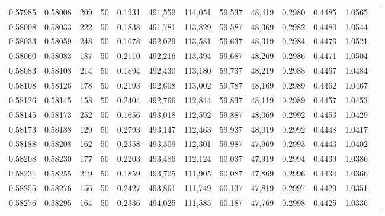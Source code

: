 \begin{tabular}{rrrrrrrrrrrrr}
0.57985 & 0.58008 &   209 &  50 &                                     0.1931 & 491,559 & 114,051 &  59,537 &  48,419 & 0.2980 & 0.4485 & 1.0565 \\
0.58008 & 0.58033 &   222 &  50 &                                     0.1838 & 491,781 & 113,829 &  59,587 &  48,369 & 0.2982 & 0.4480 & 1.0544 \\
0.58033 & 0.58059 &   248 &  50 &                                     0.1678 & 492,029 & 113,581 &  59,637 &  48,319 & 0.2984 & 0.4476 & 1.0521 \\
0.58060 & 0.58083 &   187 &  50 &                                     0.2110 & 492,216 & 113,394 &  59,687 &  48,269 & 0.2986 & 0.4471 & 1.0504 \\
0.58083 & 0.58108 &   214 &  50 &                                     0.1894 & 492,430 & 113,180 &  59,737 &  48,219 & 0.2988 & 0.4467 & 1.0484 \\
0.58108 & 0.58126 &   178 &  50 &                                     0.2193 & 492,608 & 113,002 &  59,787 &  48,169 & 0.2989 & 0.4462 & 1.0467 \\
0.58126 & 0.58145 &   158 &  50 &                                     0.2404 & 492,766 & 112,844 &  59,837 &  48,119 & 0.2989 & 0.4457 & 1.0453 \\
0.58145 & 0.58173 &   252 &  50 &                                     0.1656 & 493,018 & 112,592 &  59,887 &  48,069 & 0.2992 & 0.4453 & 1.0429 \\
0.58173 & 0.58188 &   129 &  50 &                                     0.2793 & 493,147 & 112,463 &  59,937 &  48,019 & 0.2992 & 0.4448 & 1.0417 \\
0.58188 & 0.58208 &   162 &  50 &                                     0.2358 & 493,309 & 112,301 &  59,987 &  47,969 & 0.2993 & 0.4443 & 1.0402 \\
0.58208 & 0.58230 &   177 &  50 &                                     0.2203 & 493,486 & 112,124 &  60,037 &  47,919 & 0.2994 & 0.4439 & 1.0386 \\
0.58231 & 0.58255 &   219 &  50 &                                     0.1859 & 493,705 & 111,905 &  60,087 &  47,869 & 0.2996 & 0.4434 & 1.0366 \\
0.58255 & 0.58276 &   156 &  50 &                                     0.2427 & 493,861 & 111,749 &  60,137 &  47,819 & 0.2997 & 0.4429 & 1.0351 \\
0.58276 & 0.58295 &   164 &  50 &                                     0.2336 & 494,025 & 111,585 &  60,187 &  47,769 & 0.2998 & 0.4425 & 1.0336 \\

\end{tabular}
